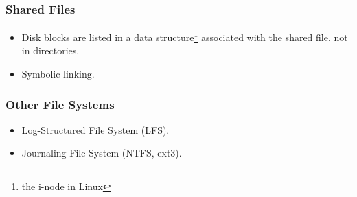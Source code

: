 \begin{frame}
    \frametitle{Shared Files}
    \begin{itemize}
        \item Disk blocks are listed in a data structure\footnote{the i-node in Linux} associated with the shared file, not in directories.
        \item Symbolic linking.
    \end{itemize}
\end{frame}

\begin{frame}
    \frametitle{Other File Systems}
    \begin{itemize}
        \item Log-Structured File System (LFS).
        \item Journaling File System (NTFS, ext3).
    \end{itemize}
\end{frame}
